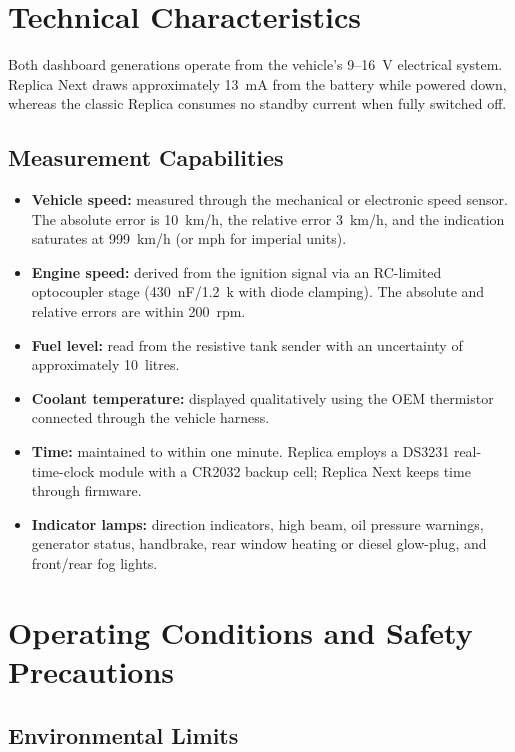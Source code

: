 \chapter{Technical Characteristics} \label{ch:technical-characteristics}

Both dashboard generations operate from the vehicle's 9--16~V electrical system.
Replica Next draws approximately 13~mA from the battery while powered down, whereas the classic Replica consumes no standby current when fully switched off.

\section{Measurement Capabilities}

\begin{itemize}
    \item \textbf{Vehicle speed:} measured through the mechanical or electronic speed sensor.
          The absolute error is 10~km/h, the relative error 3~km/h, and the indication saturates at 999~km/h (or mph for imperial units).
    \item \textbf{Engine speed:} derived from the ignition signal via an RC-limited optocoupler stage (430~nF/1.2~k\ohm{} with diode clamping).
          The absolute and relative errors are within 200~rpm.
    \item \textbf{Fuel level:} read from the resistive tank sender with an uncertainty of approximately 10~litres.
    \item \textbf{Coolant temperature:} displayed qualitatively using the OEM thermistor connected through the vehicle harness.
    \item \textbf{Time:} maintained to within one minute.
          Replica employs a DS3231 real-time-clock module with a CR2032 backup cell; Replica Next keeps time through firmware.
    \item \textbf{Indicator lamps:} direction indicators, high beam, oil pressure warnings, generator status, handbrake, rear window heating or diesel glow-plug, and front/rear fog lights.
\end{itemize}

\chapter{Operating Conditions and Safety Precautions} \label{ch:operating-conditions}

\section{Environmental Limits}

